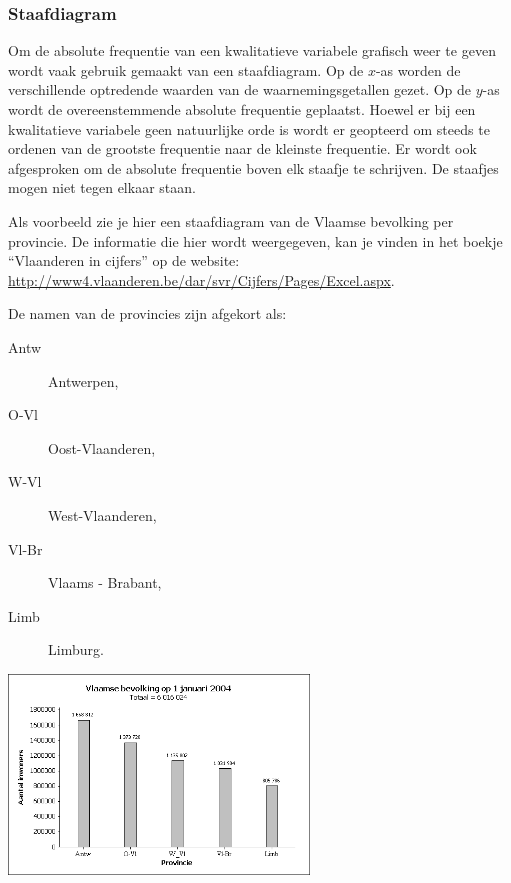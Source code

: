 \documentclass[12pt,twoside]{article}
\begin{document}
\subsubsection{Staafdiagram}

Om de absolute frequentie van een kwalitatieve variabele grafisch weer te geven wordt vaak gebruik gemaakt van een staafdiagram. Op de $x$-as worden de verschillende optredende waarden van de waarnemingsgetallen gezet. Op de $y$-as wordt de overeenstemmende absolute frequentie geplaatst. Hoewel er bij een kwalitatieve variabele geen natuurlijke orde is wordt er geopteerd om steeds te ordenen van de grootste frequentie naar de kleinste frequentie. Er wordt ook afgesproken om de absolute frequentie boven elk staafje te schrijven. De staafjes mogen niet tegen elkaar staan.

Als voorbeeld zie je hier een staafdiagram
van de Vlaamse bevolking per provincie. De
informatie die hier wordt weergegeven, kan
je vinden in het boekje “Vlaanderen in
cijfers” op de website:
\url{http://www4.vlaanderen.be/dar/svr/Cijfers/Pages/Excel.aspx}.

  
\begin{minipage}{0.5\textwidth}
De namen van de provincies zijn afgekort als:
  \begin{description}
    \item[Antw] Antwerpen,
    \item[O-Vl] Oost-Vlaanderen,
    \item[W-Vl] West-Vlaanderen,
    \item[Vl-Br] Vlaams - Brabant,
    \item[Limb] Limburg.
  \end{description}
\end{minipage}
\begin{minipage}{0.5\textwidth}
%  
  \includegraphics[width=8cm]{vlaamse_bevolking.png}
\end{minipage}
\end{document}
